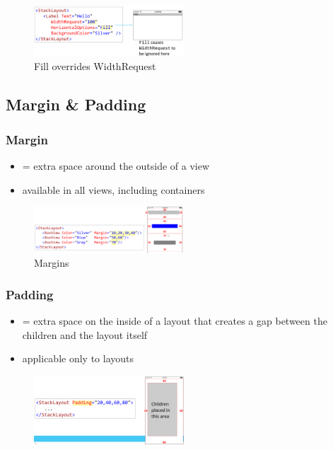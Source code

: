 \documentclass{article}
\begin{document}
\begin{figure}[H]
    \centering
    \includegraphics[width=0.5\textwidth]{xaml-fill.png}
    \caption{Fill overrides WidthRequest}
\end{figure}

\subsection{Margin \& Padding}

\subsubsection{Margin}

\begin{itemize}
    \item = extra space around the outside of a view
    \item available in all views, including containers
\end{itemize}

\begin{figure}[H]
    \centering
    \includegraphics[width=0.5\textwidth]{xaml-margins.png}
    \caption{Margins}
\end{figure}

\subsubsection{Padding}

\begin{itemize}
    \item = extra space on the inside of a layout that creates a gap between the children and the layout itself
    \item applicable only to layouts
\end{itemize}

\begin{figure}[H]
    \centering
    \includegraphics[width=0.5\textwidth]{xaml-padding.png}
    \caption{}
\end{figure}
\end{document}
